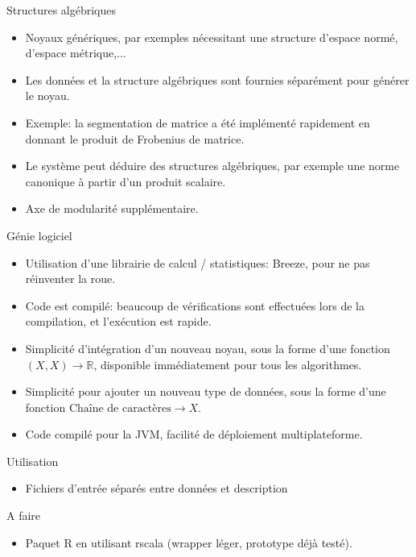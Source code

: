 \documentclass{beamer}
\begin{document}
\begin{frame}{Structures algébriques}
	\begin{itemize}
		\item Noyaux génériques, par exemples nécessitant une structure d'espace normé, d'espace métrique,...
		\item Les données et la structure algébriques sont fournies séparément pour générer le noyau.
		\item Exemple: la segmentation de matrice a été implémenté rapidement en donnant le produit de Frobenius de matrice.
		\item Le système peut déduire des structures algébriques, par exemple une norme canonique à partir d'un produit scalaire.
		\item Axe de modularité supplémentaire.
	\end{itemize}

\end{frame}

\begin{frame}{Génie logiciel}
	\begin{itemize}
		\item Utilisation d'une librairie de calcul / statistiques: Breeze, pour ne pas réinventer la roue.
		\item Code est compilé: beaucoup de vérifications sont effectuées lors de la compilation, et l'exécution est rapide.
		\item Simplicité d'intégration d'un nouveau noyau, sous la forme d'une fonction $(X, X) \rightarrow \mathbb{R}$, disponible immédiatement pour tous les algorithmes.
		\item Simplicité pour ajouter un nouveau type de données, sous la forme d'une fonction $\text{Chaîne de caractères} \rightarrow X$.
		\item Code compilé pour la JVM, facilité de déploiement multiplateforme.
	\end{itemize}
\end{frame}

\begin{frame}{Utilisation}
	\begin{itemize}
		\item Fichiers d'entrée séparés entre données et description
	\end{itemize}
\end{frame}

\begin{frame}{A faire}
	\begin{itemize}
		\item Paquet R en utilisant rscala (wrapper léger, prototype déjà testé).
	\end{itemize}
\end{frame}
\end{document}
